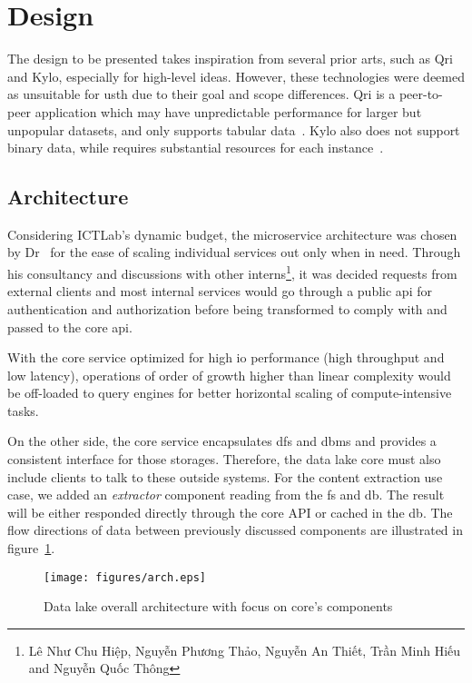 \section{Design}
The design to be presented takes inspiration from several prior arts, such as
Qri and Kylo, especially for high-level ideas.  However, these technologies were
deemed as unsuitable for \gls{usth} due to their goal and scope differences.
Qri is a peer-to-peer application which may have unpredictable performance
for larger but unpopular datasets, and only supports tabular data~\cite{qri}.
Kylo also does not support binary data, while requires substantial resources
for each instance~\cite{kylo}.

\subsection{Architecture}
Considering ICTLab's dynamic budget, the microservice architecture was chosen
by Dr~\thesupervisor{} for the ease of scaling
individual services out only when in need.  Through his consultancy
and discussions with other interns\footnote{Lê
Như Chu Hiệp, Nguyễn Phương Thảo, Nguyễn An Thiết, Trần Minh Hiếu
and Nguyễn Quốc Thông}, it was decided requests from external clients
and most internal services would go through a public \gls{api} for
authentication and authorization before being transformed to comply with
and passed to the core \gls{api}.

With the core service optimized for high \gls{io} performance (high throughput
and low latency), operations of order of growth higher than linear complexity
would be off-loaded to query engines for better horizontal scaling
of compute-intensive tasks.

On the other side, the core service encapsulates \gls{dfs} and \gls{dbms}
and provides a consistent interface for those storages.  Therefore,
the data lake core must also include clients to talk to these outside systems.
For the content extraction use case, we added an \emph{extractor} component
reading from the \gls{fs} and \gls{db}.  The result will be either responded
directly through the core API or cached in the \gls{db}.  The flow directions
of data between previously discussed components are illustrated
in figure~\ref{arch}.

\begin{figure}\centering
  \texttt{[image: figures/arch.eps]}
  \caption{Data lake overall architecture with focus on core's components}
  \label{arch}
\end{figure}

